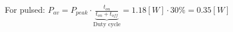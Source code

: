 \documentclass[preview]{standalone}
\begin{document}
\begin{center}
For pulsed: $P_{av} = P_{peak} \cdot \underbrace{\frac{t_{on}}{t_{on}+t_{off}}}_{\text{Duty cycle}}=$$1.18 [W] \cdot 30 \%$$= 0.35 [W]$
\end{center}
\end{document}
